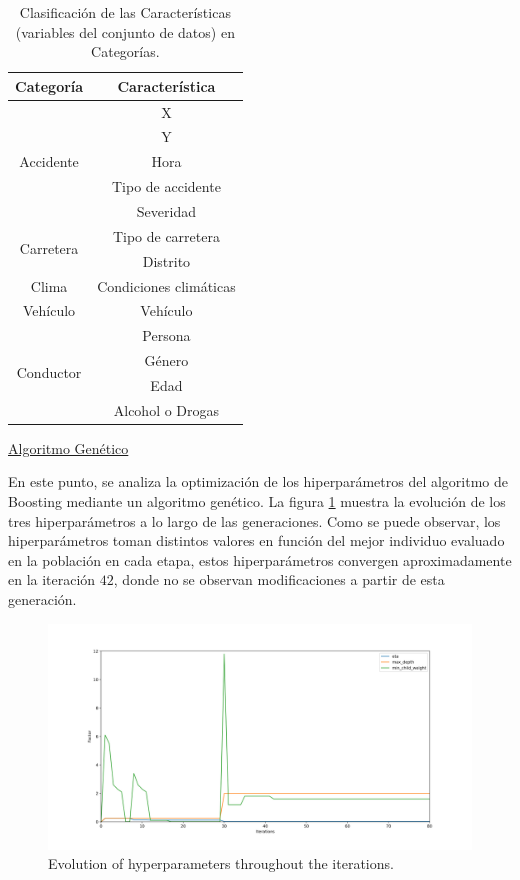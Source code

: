 \documentclass{uathesis-es}
\begin{document}
{\begin{table}[H]
		\begin{tabular}{ |c|c| }
			\hline
			\textbf{Categoría} & \textbf{Característica} \\
			\hline
			\hline
			\multirow{5}{*}{Accidente} & X \\
			& Y \\
			& Hora \\
			& Tipo de accidente \\
			& Severidad \\
			\hline
			\hline
			\multirow{2}{*}{Carretera} & Tipo de carretera \\
			& Distrito \\
			\hline
			\hline
			Clima & Condiciones climáticas \\
			\hline
			\hline
			Vehículo & Vehículo \\
			\hline
			\hline
			\multirow{4}{*}{Conductor} & Persona \\
			& Género \\
			& Edad \\
			& Alcohol o Drogas \\
			\hline
			\hline
		\end{tabular}
		
		\caption{Clasificación de las Características (variables del conjunto de datos) en Categorías.}
		\label{JC}
	\end{table}
	
	
	\underline{Algoritmo Genético}
	
	En este punto, se analiza la optimización de los hiperparámetros del algoritmo de Boosting mediante un algoritmo genético. La figura \ref{EvolucionHiperparametrosImage} muestra la evolución de  los tres hiperparámetros a lo largo de las generaciones. Como se puede observar, los hiperparámetros toman distintos valores en función del mejor individuo evaluado en la población en cada etapa, estos hiperparámetros convergen aproximadamente en la iteración $42$, donde no se observan modificaciones a partir de esta generación.
	
	\begin{figure}[H]
		\centering
		\includegraphics[width=14cm]{Figures/1stPaper/EvolutionH.png}
		\caption{Evolution of hyperparameters throughout the iterations.}
		\label{EvolucionHiperparametrosImage}
	\end{figure}
	
}
\end{document}
